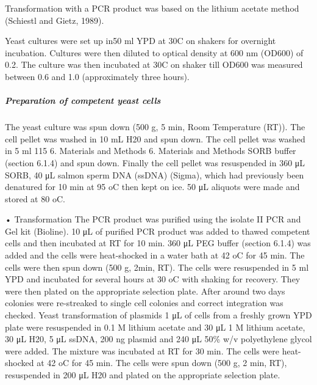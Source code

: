 Transformation with a PCR product was based on the lithium acetate method (Schiestl and Gietz, 1989).

Yeast cultures were set up in50 ml YPD at 30C on shakers for overnight incubation. Cultures were then diluted to optical density at 600 nm (OD600) of 0.2. The culture was then incubated at 30C on shaker till OD600 was measured between 0.6 and 1.0 (approximately three hours).

\subparagraph{Preparation of competent yeast cells} 

The yeast culture was spun down (500 g, 5 min, Room Temperature (RT)). The cell
pellet was washed in 10 mL H20 and spun down. The cell pellet was washed in 5 ml 115
6. Materials and Methods
6. Materials and Methods
SORB buffer (section 6.1.4) and spun down. Finally the cell pellet was resuspended in 360 μL SORB, 40 μL salmon sperm DNA (ssDNA) (Sigma), which had previously been denatured for 10 min at 95 oC then kept on ice. 50 μL aliquots were made and stored at 80 oC.

• Transformation
The PCR product was purified using the isolate II PCR and Gel kit (Bioline). 10 μL of purified PCR product was added to thawed competent cells and then incubated at RT for 10 min. 360 μL PEG buffer (section 6.1.4) was added and the cells were heat-shocked in a water bath at 42 oC for 45 min. The cells were then spun down (500 g, 2min, RT). The cells were resuspended in 5 ml YPD and incubated for several hours at 30 oC with shaking for recovery. They were then plated on the appropriate selection plate. After around two days colonies were re-streaked to single cell colonies and correct integration was checked.
Yeast transformation of plasmids
1 μL of cells from a freshly grown YPD plate were resuspended in 0.1 M lithium acetate and 30 μL 1 M lithium acetate, 30 μL H20, 5 μL ssDNA, 200 ng plasmid and 240 μL 50\% w/v polyethylene glycol were added. The mixture was incubated at RT for 30 min. The cells were heat-shocked at 42 oC for 45 min. The cells were spun down (500 g, 2 min, RT), resuspended in 200 μL H20 and plated on the appropriate selection plate.
